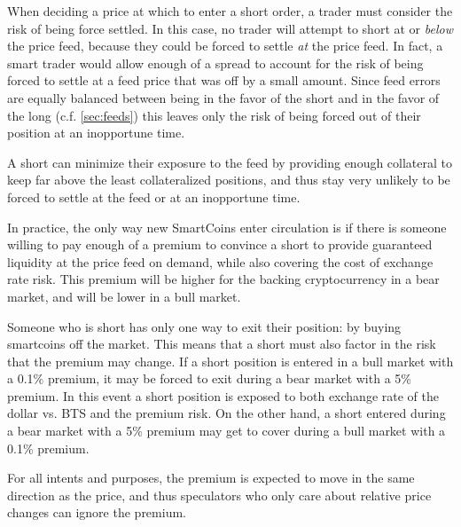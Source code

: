 When deciding a price at which to enter a short order, a trader must consider
the risk of being force settled. In this case, no trader will attempt to short
at or \emph{below} the price feed, because they could be forced to settle
\emph{at} the price feed. In fact, a smart trader would allow enough of a
spread to account for the risk of being forced to settle at a feed price that
was off by a small amount. Since feed errors are equally balanced between being
in the favor of the short and in the favor of the long (c.f. \cref{sec:feeds})
this leaves only the risk of being forced out of their position at an
inopportune time.

A short can minimize their exposure to the feed by providing enough collateral
to keep far above the least collateralized positions, and thus stay very
unlikely to be forced to settle at the feed or at an inopportune time.

\medskip
In practice, the only way new SmartCoins enter circulation is if there is
someone willing to pay enough of a premium to convince a short to provide
guaranteed liquidity at the price feed on demand, while also covering the cost
of exchange rate risk. This premium will be higher for the backing
cryptocurrency in a bear market, and will be lower in a bull market.

Someone who is short has only one way to exit their position: by buying
smartcoins off the market. This means that a short must also factor in the risk
that the premium may change. If a short position is entered in a bull market
with a 0.1\% premium, it may be forced to exit during a bear market with a 5\%
premium. In this event a short position is exposed to both exchange rate of the
dollar vs. BTS and the premium risk. On the other hand, a short entered during
a bear market with a 5\% premium may get to cover during a bull market with a
0.1\% premium.

For all intents and purposes, the premium is expected to move in the same
direction as the price, and thus speculators who only care about relative price
changes can ignore the premium.
